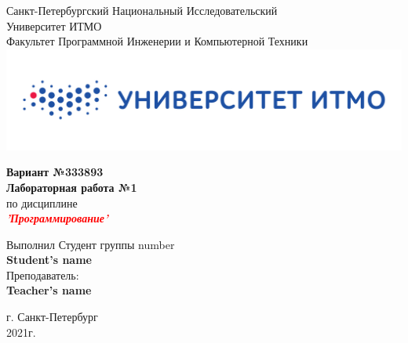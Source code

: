 \documentclass[12pt,onecolumn]{article}
\begin{document}
\begin{center}
    Санкт-Петербургский Национальный Исследовательский\\ 
    Университет ИТМО\\
    Факультет Программной Инженерии и Компьютерной Техники\\
    \includegraphics[scale=0.3]{itm.jpg} %
\end{center}
\vspace{1cm}


\begin{center}
    \large \textbf{Вариант №333893}\\
    \textbf{Лабораторная работа №1}\\
    по дисциплине\\
    \textbf{\textcolor{red}{\textit{'Программирование'}}}
\end{center}

\vspace{2cm}

\begin{flushright}
  Выполнил Студент  группы number\\
  \textbf{Student's name}\\
  Преподаватель: \\
  \textbf{Teacher's name}\\
\end{flushright}

\vspace{6cm}
\begin{center}
    г. Санкт-Петербург\\
    2021г.
\end{center}

\newpage
\end{document}
